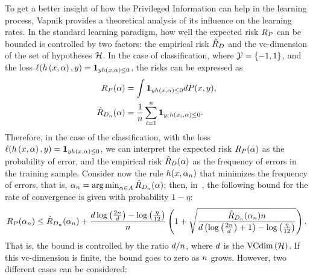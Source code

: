 To get a better insight of how the Privileged Information can help in the learning process, Vapnik provides a theoretical analysis of its influence on the learning rates.
In the standard learning paradigm, how well the expected risk $R_P$ can be bounded is controlled by two factors: the empirical risk $\hat{R}_{D}$ and the \acrshort{vc}-dimension of the set of hypotheses $\mathcal{\mathcal{H}}$.
In the case of classification, where $\mathcal{Y} = \left\{-1, 1\right\}$, and the loss $\ell(h\left(x, \alpha\right), y) = \bm{1}_{y h\left(x, \alpha\right) \leq 0}$, the risks can be expressed as
\begin{align*}
    \nonumber
    R_P (\alpha) &= \int \bm{1}_{y h\left(x, \alpha\right) \leq 0} dP(x, y),\\
    \hat{R}_{D_{n}}(\alpha) &= \frac{1}{n} \sum_{i=1}^n \bm{1}_{y_i h\left(x_i, \alpha\right) \leq 0}.
\end{align*}
Therefore, in the case of the classification, with the loss $\ell(h\left(x, \alpha\right), y) = \bm{1}_{y h\left(x, \alpha\right) \leq 0}$, we can interpret the expected risk $R_P (\alpha)$ as the probability of error, and the empirical risk $\hat{R}_{D}(\alpha)$ as the frequency of errors in the training sample.
Consider now the rule $h(x, \alpha_n)$ that minimizes the frequency of errors, that is, $\alpha_n = \operatorname*{arg\min}_{\alpha \in A} \hat{R}_{D_{n}}(\alpha)$; then, in~\citet[Theorem~6.8]{vapnik1982estimation}, the following bound for the rate of convergence is given with probability $1 - \eta$:
\begin{equation}
    \label{eq:fullvc_bound}
    \exprisk(\param_\nsamples) \leq \empriskn(\param_\nsamples) + \frac{\vc \log\left(\frac{2\nsamples}{\vc} \right) - \log\left(\frac{\eta}{12}\right)}{\nsamples} \left(1 + \sqrt{ \frac{\empriskn(\param_\nsamples) \nsamples}{\vc \left(\log\left(\frac{2\nsamples}{\vc} \right) + 1\right) - \log\left(\frac{\eta}{12}\right)}} \right) .
\end{equation}
That is, the bound is controlled by the ratio $d/n$, where $d$ is the $\operatorname{VCdim}\left(\mathcal{H}\right)$. If this \acrshort{vc}-dimension is finite, the bound goes to zero as $n$ grows.
However, two different cases can be considered:
